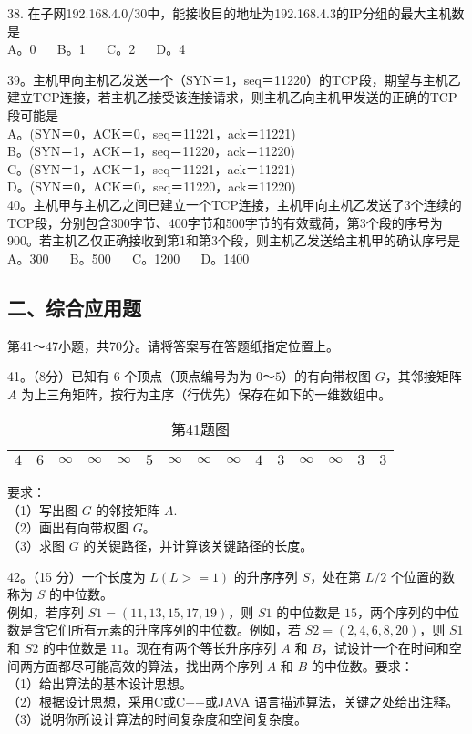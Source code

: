 38. 在子网192.168.4.0/30中，能接收目的地址为192.168.4.3的IP分组的最大主机数是 \\
A。0 $\quad$ B。1 $\quad$ C。2 $\quad$ D。4

39。主机甲向主机乙发送一个（SYN＝1，seq＝11220）的TCP段，期望与主机乙建立TCP连接，若主机乙接受该连接请求，则主机乙向主机甲发送的正确的TCP段可能是 \\
A。(SYN＝0，ACK＝0，seq＝11221，ack＝11221) \\
B。(SYN＝1，ACK＝1，seq＝11220，ack＝11220) \\
C。(SYN＝1，ACK＝1，seq＝11221，ack＝11221) \\
D。(SYN＝0，ACK＝0，seq＝11220，ack＝11220) \\

40。主机甲与主机乙之间已建立一个TCP连接，主机甲向主机乙发送了3个连续的TCP段，分别包含300字节、400字节和500字节的有效载荷，第3个段的序号为900。若主机乙仅正确接收到第1和第3个段，则主机乙发送给主机甲的确认序号是 \\
A。300 $\quad$ B。500 $\quad$ C。1200 $\quad$ D。1400


\subsection{二、综合应用题}
第41～47小题，共70分。请将答案写在答题纸指定位置上。

41。（8分）已知有 $6$ 个顶点（顶点编号为为 $0$～$5$）的有向带权图 $G$，其邻接矩阵 $A$ 为上三角矩阵，按行为主序（行优先）保存在如下的一维数组中。
\begin{table}[ht]
\centering
\caption{第41题图}\label{Na11_tab1}
\begin{tabular}{|c|c|c|c|c|c|c|c|c|c|c|c|c|c|c|}
\hline
$4$ & $6$ & $\infty$ & $\infty$ & $\infty$ & $5$ & $\infty$ & $\infty$ & $\infty$ & $4$ & $3$ & $\infty$ & $\infty$ & $3$ & $3$ \\
\hline
\end{tabular}
\end{table}
要求：  \\
（1）写出图 $G$ 的邻接矩阵 $A$.  \\
（2）画出有向带权图 $G$。  \\
（3）求图 $G$ 的关键路径，并计算该关键路径的长度。

42。（15 分）一个长度为 $L(L>=1)$ 的升序序列 $S$，处在第 $L/2$ 个位置的数称为 $S$ 的中位数。 \\
例如，若序列 $S1=(11,13,15,17,19)$，则 $S1$ 的中位数是 $15$，两个序列的中位数是含它们所有元素的升序序列的中位数。例如，若 $S2=(2,4,6,8,20)$，则 $S1$ 和 $S2$ 的中位数是 $11$。现在有两个等长升序序列 $A$ 和 $B$，试设计一个在时间和空间两方面都尽可能高效的算法，找出两个序列 $A$ 和 $B$ 的中位数。要求： \\
（1）给出算法的基本设计思想。 \\
（2）根据设计思想，采用C或C++或JAVA 语言描述算法，关键之处给出注释。 \\
（3）说明你所设计算法的时间复杂度和空间复杂度。 \\

